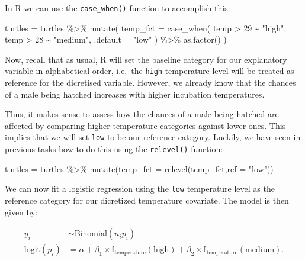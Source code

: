 \documentclass[
  letterpaper,
  DIV=11,
  numbers=noendperiod]{scrartcl}
\newenvironment{Shaded}{\begin{snugshade}}{\end{snugshade}}
\newcommand{\AttributeTok}[1]{\textcolor[rgb]{0.40,0.45,0.13}{#1}}
\newcommand{\DecValTok}[1]{\textcolor[rgb]{0.68,0.00,0.00}{#1}}
\newcommand{\FunctionTok}[1]{\textcolor[rgb]{0.28,0.35,0.67}{#1}}
\newcommand{\NormalTok}[1]{\textcolor[rgb]{0.00,0.23,0.31}{#1}}
\newcommand{\OtherTok}[1]{\textcolor[rgb]{0.00,0.23,0.31}{#1}}
\newcommand{\SpecialCharTok}[1]{\textcolor[rgb]{0.37,0.37,0.37}{#1}}
\newcommand{\StringTok}[1]{\textcolor[rgb]{0.13,0.47,0.30}{#1}}
\begin{document}
In R we can use the \texttt{case\_when()} function to accomplish this:

\begin{Shaded}
\begin{Highlighting}[]
\NormalTok{turtles }\OtherTok{=}\NormalTok{ turtles  }\SpecialCharTok{\%\textgreater{}\%} \FunctionTok{mutate}\NormalTok{(}
  \AttributeTok{temp\_fct =} \FunctionTok{case\_when}\NormalTok{(}
\NormalTok{    temp }\SpecialCharTok{\textgreater{}} \DecValTok{29} \SpecialCharTok{\textasciitilde{}} \StringTok{"high"}\NormalTok{,}
\NormalTok{    temp }\SpecialCharTok{\textgreater{}} \DecValTok{28} \SpecialCharTok{\textasciitilde{}} \StringTok{"medium"}\NormalTok{,}
    \AttributeTok{.default =} \StringTok{"low"}
\NormalTok{  ) }\SpecialCharTok{\%\textgreater{}\%} \FunctionTok{as.factor}\NormalTok{()}
\NormalTok{) }
\end{Highlighting}
\end{Shaded}

Now, recall that as usual, R will set the baseline category for our
explanatory variable in alphabetical order, i.e.~the \texttt{high}
temperature level will be treated as reference for the dicretised
variable. However, we already know that the chances of a male being
hatched increases with higher incubation temperatures.

Thus, it makes sense to assess how the chances of a male being hatched
are affected by comparing higher temperature categories against lower
ones. This implies that we will set \texttt{low} to be our reference
category. Luckily, we have seen in previous tasks how to do this using
the \texttt{relevel()} function:

\begin{Shaded}
\begin{Highlighting}[]
\NormalTok{turtles }\OtherTok{=}\NormalTok{ turtles }\SpecialCharTok{\%\textgreater{}\%}
  \FunctionTok{mutate}\NormalTok{(}\AttributeTok{temp\_fct =} \FunctionTok{relevel}\NormalTok{(temp\_fct,}\AttributeTok{ref =} \StringTok{"low"}\NormalTok{)) }
\end{Highlighting}
\end{Shaded}

We can now fit a logistic regression using the \texttt{low} temperature
level as the reference category for our dicretized temperature
covariate. The model is then given by:

\begin{align}
y_i &\sim \mathrm{Binomial}(n_ip_i)\\
\mathrm{logit}(p_i) &= \alpha +  \beta_{1}  \times \mathbb{I}_{\mathrm{temperature}}(\mathrm{high}) + \beta_{2}  \times \mathbb{I}_{\mathrm{temperature}}(\mathrm{medium}).
\end{align}
\end{document}
